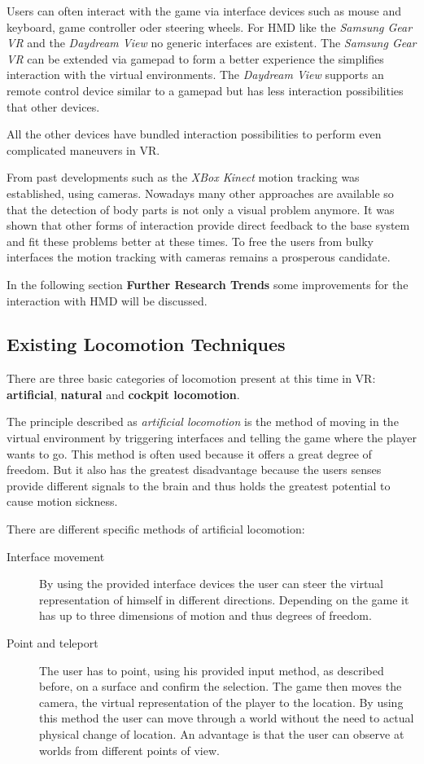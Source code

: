 Users can often interact with the game via interface devices such as mouse and 
keyboard, game controller oder steering wheels. For HMD like the 
\textit{Samsung Gear VR} and the \textit{Daydream View} no generic 
interfaces are existent. The \textit{Samsung Gear VR} can be extended via gamepad 
to form a better experience the simplifies interaction with the virtual 
environments. The \textit{Daydream View} supports an remote control device 
similar to a gamepad but has less interaction possibilities that other devices.

All the other devices have bundled interaction possibilities to perform even 
complicated maneuvers in VR. 

From past developments such as the \textit{XBox Kinect} motion tracking was established, using cameras. Nowadays many other approaches are available so that the detection of body parts is not only a visual problem anymore. It was shown that other forms of interaction provide direct feedback to the base system and fit these problems better at these times. To free the users from bulky interfaces the motion tracking with cameras remains a prosperous candidate.

In the following section \textbf{Further Research Trends} some improvements for 
the interaction with HMD will be discussed.

\subsection{Existing Locomotion Techniques}
\label{sec:exLocomotion}

There are three basic categories of locomotion present at this time in VR: 
\textbf{artificial}, \textbf{natural} and \textbf{cockpit locomotion}.

The principle described as \textit{artificial locomotion} is the method of 
moving in the virtual environment by triggering interfaces and telling the game 
where the player wants to go. This method is often used because it offers a great 
degree of freedom. But it also has the greatest disadvantage because the users 
senses provide different signals to the brain and thus holds the greatest 
potential to cause motion sickness.

There are different specific methods of artificial locomotion:
\begin{description}
	\item[Interface movement]By using the provided interface devices the user 
	can steer the virtual representation of himself in different directions. 
	Depending on the game it has up to three dimensions of motion and thus 
	degrees of freedom.
	\item[Point and teleport]The user has to point, using his provided input 
	method, as described before, on a surface and confirm the selection. The 
	game then moves the camera, the virtual representation of the player to the 
	location. By using this method the user can move through a world without 
	the need to actual physical change of location. An advantage is that 
	the user can observe at worlds from different points of view.
\end{description}

